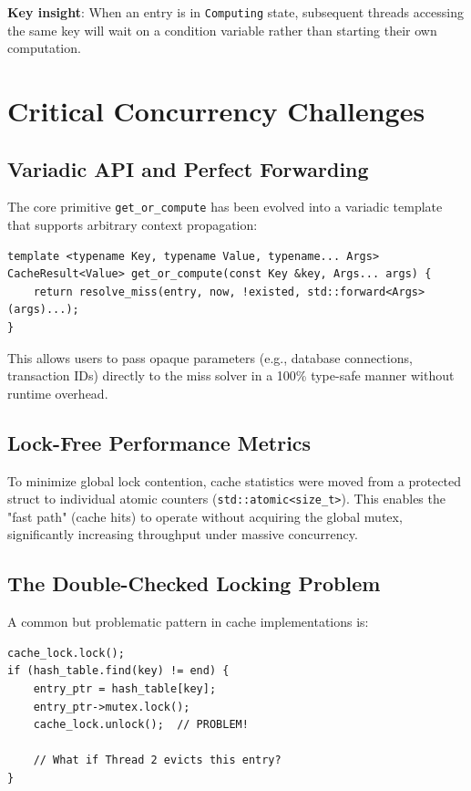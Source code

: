 \documentclass[11pt,a4paper]{article}
\begin{document}
\textbf{Key insight}: When an entry is in \texttt{Computing} state, subsequent
threads accessing the same key will wait on a condition variable rather
than starting their own computation.

\section{Critical Concurrency Challenges}

\subsection{Variadic API and Perfect Forwarding}

The core primitive \texttt{get\_or\_compute} has been evolved into a
variadic template that supports arbitrary context propagation:

\begin{lstlisting}[caption=Variadic API with Perfect Forwarding]
template <typename Key, typename Value, typename... Args>
CacheResult<Value> get_or_compute(const Key &key, Args... args) {
    return resolve_miss(entry, now, !existed, std::forward<Args>(args)...);
}
\end{lstlisting}

This allows users to pass opaque parameters (e.g., database connections, 
transaction IDs) directly to the miss solver in a 100\% type-safe manner 
without runtime overhead.

\subsection{Lock-Free Performance Metrics}

To minimize global lock contention, cache statistics were moved from a 
protected struct to individual atomic counters (\lstinline|std::atomic<size_t>|). 
This enables the "fast path" (cache hits) to operate without acquiring the 
global mutex, significantly increasing throughput under massive concurrency.

\subsection{The Double-Checked Locking Problem}

A common but problematic pattern in cache implementations is:

\begin{lstlisting}[caption=Problematic synchronization pattern]
cache_lock.lock();
if (hash_table.find(key) != end) {
    entry_ptr = hash_table[key];
    entry_ptr->mutex.lock();
    cache_lock.unlock();  // PROBLEM!
    
    // What if Thread 2 evicts this entry?
}
\end{lstlisting}
\end{document}
